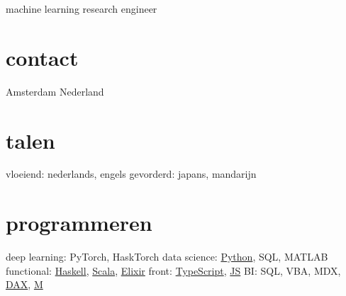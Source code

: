 \documentclass[]{friggeri-cv}
\begin{document}
       {machine learning research engineer}


\begin{aside}
  \section{contact}
  Amsterdam
  Nederland
  ~
  \section{talen}
  vloeiend: nederlands, engels
  gevorderd: japans, mandarijn
  \section{programmeren}
  deep learning: PyTorch, HaskTorch
  data science: \href{https://github.com/tycho01?tab=repositories&language=python}{Python}, SQL, MATLAB %
  functional: \href{https://github.com/tycho01?tab=repositories&language=haskell}{Haskell}, \href{https://github.com/tycho01?tab=repositories&language=scala}{Scala}, \href{https://github.com/tycho01?tab=repositories&language=elixir}{Elixir}
  front: \href{https://github.com/tycho01?tab=repositories&language=typescript}{TypeScript}, \href{https://github.com/tycho01?tab=repositories&language=javascript}{JS}
  BI: SQL, VBA, MDX, \href{https://powerpivotpro.com/2014/02/optimal-set-selection-power-pivot-does-pokemon-and-my-brain-just-exploded/}{DAX}, \href{https://github.com/tycho01/pquery}{M}
\end{aside}
\end{document}
